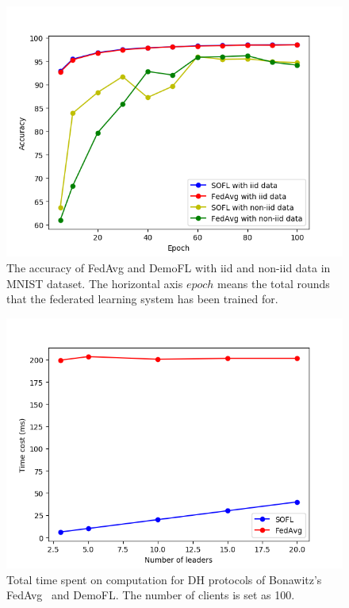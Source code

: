 \begin{figure}[!ht]
    \centering
    \includegraphics[width=\columnwidth]{img/acc.png}
    \caption{The accuracy of FedAvg and DemoFL with iid and non-iid data in MNIST dataset. The horizontal axis $epoch$ means the total rounds that the federated learning system has been trained for.}
    \label{acc}
\end{figure}

\begin{figure}[!ht]
    \centering
    \includegraphics[width=\columnwidth]{img/leader-time.png}
    \caption{Total time spent on computation for DH protocols of Bonawitz's FedAvg~\cite{Practical} and DemoFL. The number of clients is set as 100.}
    \label{leader-time}
\end{figure}


